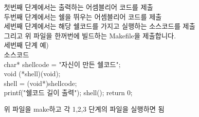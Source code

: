 \documentclass[a4paper, 11pt]{article}
\theoremstyle{definition}
\begin{document}
  첫번째 단계에서는 출력하는 어셈블리어 코드를 제출\\
  두번째 단계에서는 쉘을 뛰우는 어셈블리어 코드를 제출\\
  세번째 단계에서는 해당 쉘코드를 가지고 실행하는 소스코드를 제출\\
   
   그리고 위 파일을 한꺼번에 빌드하는 Makefile을 제출합니다. \\

세번째 단계 예)\\

소스코드\\

	char* shellcode = "자신이 만든 쉘코드";\\
	
	void (*shell)(void);\\

	shell = (void*)shellcode;\\

	printf("쉘코드 길이 출력");
	shell();
	return 0;

  위 파일을 make하고 각 1,2,3 단계의 파일을 실행하면 됨
 
\end{document}
